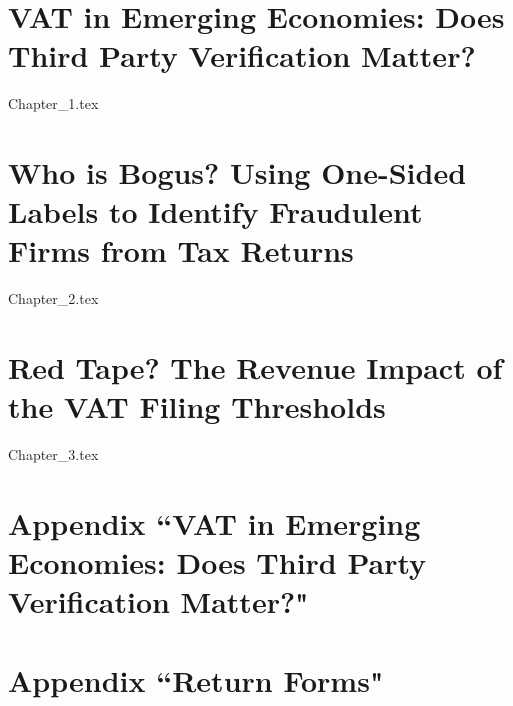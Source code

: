 \documentclass[PhD, final]{uclathes}
\begin{document}
\makeintropages

\chapter{VAT in Emerging Economies: Does Third Party Verification Matter?}
 {Chapter_1.tex} 

\chapter{Who is Bogus? Using One-Sided Labels to Identify Fraudulent Firms from Tax Returns}
 {Chapter_2.tex}                         %

\chapter{Red Tape? The Revenue Impact of the VAT Filing Thresholds}
 {Chapter_3.tex}                         %

\appendix
\chapter{Appendix ``VAT in Emerging Economies: Does Third Party Verification Matter?"}


\chapter{Appendix ``Return Forms"}


\newpage
{}


\end{document}
